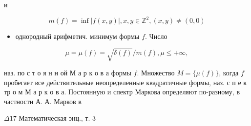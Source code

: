 \documentclass[10pt]{article}
\begin{document}
и



\[

m(f)=\inf |f(x, y)|, x, y \in \mathbb{Z}^{2},(x, y) \neq(0,0)

\]



\begin{itemize}

  \item однородный арифметич. минимум формы $f$. Число

\end{itemize}



\[

\mu=\mu(f)=\sqrt{\delta(f)} / m(f), \mu \leqslant+\infty,

\]



наз. по с т о я н н ой М а р к о в а формы $f$. Множество $M=\{\mu(f)\}$, когда $f$ пробегает все действительные неопределенные квадратичные формы, наз. с п е к тр о м М а р к о в а. Постоянную и спектр Маркова определяют по-разному, в частности А. А. Марков в



$\Delta 17$ Математическая энц., т. 3
\end{document}
